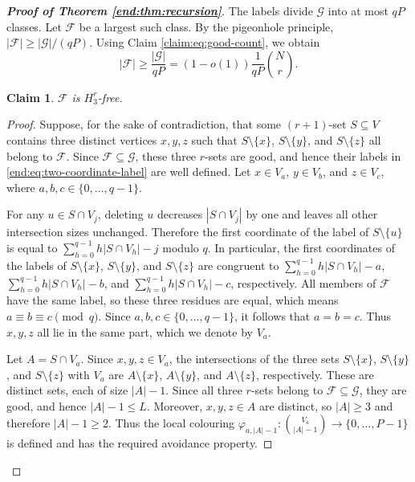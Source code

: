 \documentclass[12pt,a4paper]{article}
\numberwithin{equation}{section}
\newtheorem{claim}[theorem]{Claim}
\theoremstyle{definition}
\theoremstyle{remark}
\begin{document}
\begin{proof}[\bfseries{Proof of Theorem \ref{end:thm:recursion}}]
The labels divide $\mathcal G$ into at most $qP$ classes.  Let $\mathcal F$ be a largest such class.  By the pigeonhole principle,
$|\mathcal F|\ge|\mathcal G|/(qP)$.
Using Claim \ref{claim:eq:good-count}, we obtain
\begin{equation}\label{end:eq:class-size}
 |\mathcal F|\ge\frac{|\mathcal G|}{qP}
 =(1-o(1))\frac1{qP}\binom Nr.
\end{equation}


\begin{claim}\label{claim:f-is-h3r-free}
$\mathcal F$ is $H_3^r$-free.
\end{claim}
\begin{proof}
Suppose, for the sake of contradiction, that some $(r+1)$-set $S\subseteq V$ contains three distinct vertices $x,y,z$ such that
$S\setminus\{x\}$, $S\setminus\{y\}$, and $S\setminus\{z\}$ all belong to $\mathcal F$.  
Since $\mathcal F\subseteq\mathcal G$, these three $r$-sets are good, and hence their labels in \eqref{end:eq:two-coordinate-label} are well defined.  
Let $x\in V_a$, $y\in V_b$, and $z\in V_c$, where $a,b,c\in\{0,\ldots,q-1\}$.

For any $u\in S\cap V_j$, deleting $u$ decreases $|S\cap V_j|$ by one and leaves all other intersection sizes unchanged.  
Therefore the first coordinate of the label of $S\setminus\{u\}$ is equal to $\sum_{h=0}^{q-1}h|S\cap V_h|-j$ modulo $q$.
In particular, the first coordinates of the labels of $S\setminus\{x\}$, $S\setminus\{y\}$, and $S\setminus\{z\}$ are congruent to
$\sum_{h=0}^{q-1}h|S\cap V_h|-a$,
$\sum_{h=0}^{q-1}h|S\cap V_h|-b$, and
$\sum_{h=0}^{q-1}h|S\cap V_h|-c$,
respectively.  
All members of $\mathcal F$ have the same label, so these three residues are equal, which means $a\equiv b\equiv c\pmod q$.
Since $a,b,c\in\{0,\ldots,q-1\}$, it follows that $a=b=c$.  
Thus $x,y,z$ all lie in the same part, which we denote by $V_a$.

Let $A=S\cap V_a$.  Since $x,y,z\in V_a$, the intersections of the three sets $S\setminus\{x\}$, $S\setminus\{y\}$, and $S\setminus\{z\}$ with $V_a$ are
$A\setminus\{x\}$, $A\setminus\{y\}$, and $A\setminus\{z\}$,
respectively.  These are distinct sets, each of size $|A|-1$.  Since all three $r$-sets belong to $\mathcal F\subseteq\mathcal G$, they are good, and hence $|A|-1\le L$.  Moreover, $x,y,z\in A$ are distinct, so $|A|\ge3$ and therefore $|A|-1\ge2$.  Thus the local colouring
$\varphi_{a,|A|-1}:\binom{V_a}{|A|-1}\to\{0,\ldots,P-1\}$
is defined and has the required avoidance property.


\end{proof}
\end{proof}
\end{document}
